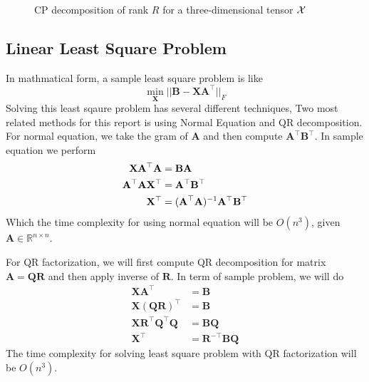 \documentclass{article}
\newcommand{\mat}[1]{\mathbf{#1}}
\newcommand{\M}[2][]{\bm{#1{\mathbf{\MakeUppercase{#2}}}}} 		%
\newcommand{\V}[2][]{\bm{#1{\mathbf{\MakeLowercase{#2}}}}} 		%
\newcommand{\T}[2][]{#1{\mathbf{\cal{#2}}}} 						%
\begin{document}
\begin{figure}[ht!]
\caption{CP decomposition of rank $R$ for a three-dimensional tensor $\T{X}$ \label{fig:3d-cp-decomp}}
\end{figure}
\subsection*{Linear Least Square Problem}
In mathmatical form, a sample least square problem is like 
$$\min_{\mat{X}}||\mat{B} - \mat{X}\mat{A}^\top||_{F}$$
Solving this least sqaure problem has several different techniques, Two most related methods for this report
is using Normal Equation and QR decomposition.
For normal equation, we take the gram of $\mat{A}$ and then compute $\mat{A}^\top\mat{B}^\top$. In sample equation we perform
\begin{align}
\mat{X}\mat{A}^\top\mat{A} &= \mat{B}\mat{A} \nonumber \\
\mat{A}^\top\mat{A}\mat{X}^\top &= \mat{A}^\top\mat{B}^\top \nonumber \\
\mat{X}^\top &= (\M{A}^\top\mat{A})^{-1}\mat{A}^\top\mat{B}^\top \nonumber
\end{align}
Which the time complexity for using normal equation will be $O(n^3)$, given $\mat{A} \in \mathbb{R}^{n \times n}$.

For QR factorization, we will first compute QR decomposition for matrix $\mat{A} = \mat{Q}\mat{R}$ and then apply inverse of $\mat{R}$. In term
of sample problem, we will do
\begin{align}
  \mat{X}\mat{A}^\top &= \mat{B} \nonumber \\
  \mat{X}(\mat{Q}\mat{R})^\top &= \mat{B} \nonumber \\
  \mat{X}\mat{R}^\top\mat{Q}^\top\mat{Q} &= \mat{B}\mat{Q} \nonumber \\
  \mat{X}^\top &= \mat{R}^{-\top}\mat{B}\mat{Q} \nonumber
\end{align} 
The time complexity for solving least square problem with QR factorization will be $O(n^3)$.
\end{document}
